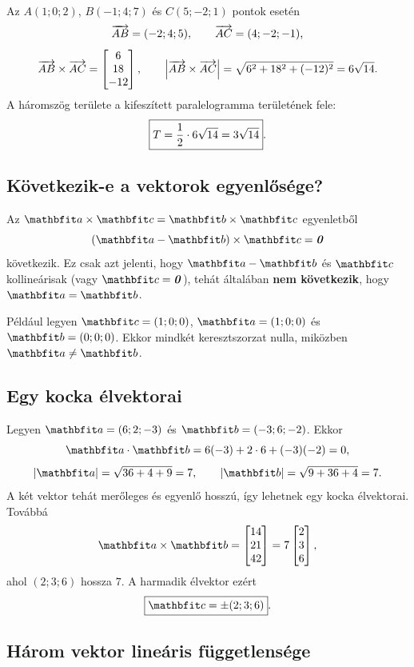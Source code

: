 \documentclass{szb-solution}
\begin{document}
Az $A(1;0;2)$, $B(-1;4;7)$ és $C(5;-2;1)$ pontok esetén
$$
  \overrightarrow{AB}=(-2;4;5),
  \qquad
  \overrightarrow{AC}=(4;-2;-1)
  \text,
$$
$$
  \overrightarrow{AB}\times\overrightarrow{AC}
  =\begin{bmatrix}
    6\\18\\-12
  \end{bmatrix},
  \qquad
  \left|\overrightarrow{AB}\times\overrightarrow{AC}\right|
  =\sqrt{6^2+18^2+(-12)^2}=6\sqrt{14}
  \text.
$$
A háromszög területe a kifeszített paralelogramma területének fele:
$$
  \boxed{T=\frac12\cdot6\sqrt{14}=3\sqrt{14}}
  \text.
$$

\subsection{Következik-e a vektorok egyenlősége?}

Az
$\rvec a\times\rvec c=\rvec b\times\rvec c$ egyenletből
$$
  (\rvec a-\rvec b)\times\rvec c=\nvec
$$
következik. Ez csak azt jelenti, hogy $\rvec a-\rvec b$ és $\rvec c$
kollineárisak (vagy $\rvec c=\nvec$), tehát általában
\textbf{nem következik}, hogy $\rvec a=\rvec b$.

Például legyen $\rvec c=(1;0;0)$, $\rvec a=(1;0;0)$ és
$\rvec b=(0;0;0)$. Ekkor mindkét keresztszorzat nulla, miközben
$\rvec a\neq\rvec b$.

\subsection{Egy kocka élvektorai}

Legyen $\rvec a=(6;2;-3)$ és $\rvec b=(-3;6;-2)$. Ekkor
$$
  \rvec a\cdot\rvec b
  =6(-3)+2\cdot6+(-3)(-2)=0,
$$
$$
  |\rvec a|=\sqrt{36+4+9}=7,
  \qquad
  |\rvec b|=\sqrt{9+36+4}=7
  \text.
$$
A két vektor tehát merőleges és egyenlő hosszú, így lehetnek egy kocka
élvektorai. Továbbá
$$
  \rvec a\times\rvec b
  =\begin{bmatrix}14\\21\\42\end{bmatrix}
  =7\begin{bmatrix}2\\3\\6\end{bmatrix}
  \text,
$$
ahol $(2;3;6)$ hossza $7$. A harmadik élvektor ezért
$$
  \boxed{\rvec c=\pm(2;3;6)}
  \text.
$$

\subsection{Három vektor lineáris függetlensége}
\end{document}

